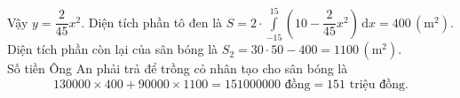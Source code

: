\begin{ex}
{{}
		\noindent
		Vậy $y=\dfrac{2}{45}x^2$. Diện tích phần tô đen là $S=2 \cdot \displaystyle\int\limits_{-15}^{15} \left(10-\dfrac{2}{45}x^2 \right) \mathrm{\,d}x=400 \, (\text{m}^2)$.\\
		Diện tích phần còn lại của sân bóng là $S_2=30 \cdot 50-400=1100\,(\text{m}^2).$\\
		Số tiền Ông An phải trả để trồng cỏ nhân tạo cho sân bóng là
		\[130000\times 400+90000\times 1100=151000000\text{ đồng}=151\text{ triệu đồng.}\]}
\end{ex}


